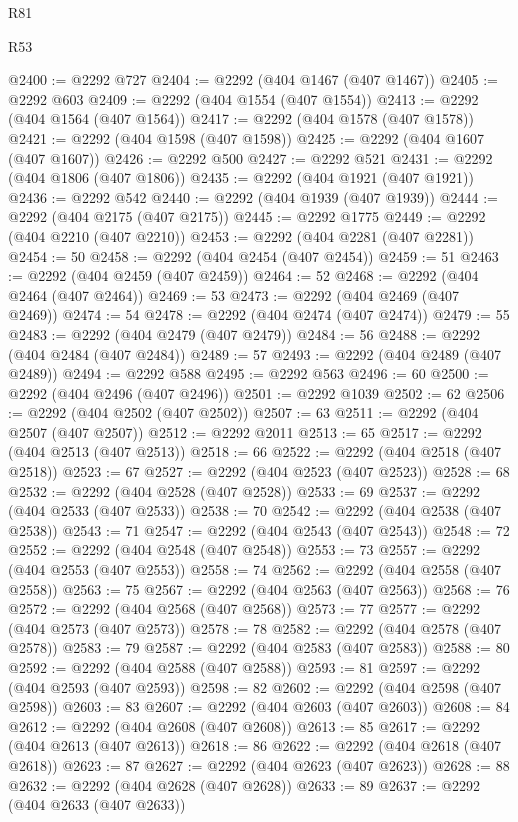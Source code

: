 \begin{lexlean}{R81}
\begin{lexlean}{R53}
\begin{coremodule}
{{{{{{{{{{{{{{{{{{{{{{{{{{{{{{{{{{{{{{{{{{{{{{{{{{{{{{{{{{{{{{{{{{{{{{{{{{{{{{{{{{{{{{{{{{{{{{{{{{{{{{{{{{{{{{{{@2400 := @2292 @727
@2404 := @2292 (@404 @1467 (@407 @1467))
@2405 := @2292 @603
@2409 := @2292 (@404 @1554 (@407 @1554))
@2413 := @2292 (@404 @1564 (@407 @1564))
@2417 := @2292 (@404 @1578 (@407 @1578))
@2421 := @2292 (@404 @1598 (@407 @1598))
@2425 := @2292 (@404 @1607 (@407 @1607))
@2426 := @2292 @500
@2427 := @2292 @521
@2431 := @2292 (@404 @1806 (@407 @1806))
@2435 := @2292 (@404 @1921 (@407 @1921))
@2436 := @2292 @542
@2440 := @2292 (@404 @1939 (@407 @1939))
@2444 := @2292 (@404 @2175 (@407 @2175))
@2445 := @2292 @1775
@2449 := @2292 (@404 @2210 (@407 @2210))
@2453 := @2292 (@404 @2281 (@407 @2281))
@2454 := 50
@2458 := @2292 (@404 @2454 (@407 @2454))
@2459 := 51
@2463 := @2292 (@404 @2459 (@407 @2459))
@2464 := 52
@2468 := @2292 (@404 @2464 (@407 @2464))
@2469 := 53
@2473 := @2292 (@404 @2469 (@407 @2469))
@2474 := 54
@2478 := @2292 (@404 @2474 (@407 @2474))
@2479 := 55
@2483 := @2292 (@404 @2479 (@407 @2479))
@2484 := 56
@2488 := @2292 (@404 @2484 (@407 @2484))
@2489 := 57
@2493 := @2292 (@404 @2489 (@407 @2489))
@2494 := @2292 @588
@2495 := @2292 @563
@2496 := 60
@2500 := @2292 (@404 @2496 (@407 @2496))
@2501 := @2292 @1039
@2502 := 62
@2506 := @2292 (@404 @2502 (@407 @2502))
@2507 := 63
@2511 := @2292 (@404 @2507 (@407 @2507))
@2512 := @2292 @2011
@2513 := 65
@2517 := @2292 (@404 @2513 (@407 @2513))
@2518 := 66
@2522 := @2292 (@404 @2518 (@407 @2518))
@2523 := 67
@2527 := @2292 (@404 @2523 (@407 @2523))
@2528 := 68
@2532 := @2292 (@404 @2528 (@407 @2528))
@2533 := 69
@2537 := @2292 (@404 @2533 (@407 @2533))
@2538 := 70
@2542 := @2292 (@404 @2538 (@407 @2538))
@2543 := 71
@2547 := @2292 (@404 @2543 (@407 @2543))
@2548 := 72
@2552 := @2292 (@404 @2548 (@407 @2548))
@2553 := 73
@2557 := @2292 (@404 @2553 (@407 @2553))
@2558 := 74
@2562 := @2292 (@404 @2558 (@407 @2558))
@2563 := 75
@2567 := @2292 (@404 @2563 (@407 @2563))
@2568 := 76
@2572 := @2292 (@404 @2568 (@407 @2568))
@2573 := 77
@2577 := @2292 (@404 @2573 (@407 @2573))
@2578 := 78
@2582 := @2292 (@404 @2578 (@407 @2578))
@2583 := 79
@2587 := @2292 (@404 @2583 (@407 @2583))
@2588 := 80
@2592 := @2292 (@404 @2588 (@407 @2588))
@2593 := 81
@2597 := @2292 (@404 @2593 (@407 @2593))
@2598 := 82
@2602 := @2292 (@404 @2598 (@407 @2598))
@2603 := 83
@2607 := @2292 (@404 @2603 (@407 @2603))
@2608 := 84
@2612 := @2292 (@404 @2608 (@407 @2608))
@2613 := 85
@2617 := @2292 (@404 @2613 (@407 @2613))
@2618 := 86
@2622 := @2292 (@404 @2618 (@407 @2618))
@2623 := 87
@2627 := @2292 (@404 @2623 (@407 @2623))
@2628 := 88
@2632 := @2292 (@404 @2628 (@407 @2628))
@2633 := 89
@2637 := @2292 (@404 @2633 (@407 @2633))
}}}}}}}}}}}}}}}}}}}}}}}}}}}}}}}}}}}}}}}}}}}}}}}}}}}}}}}}}}}}}}}}}}}}}}}}}}}}}}}}}}}}}}}}}}}}}}}}}}}}}}}}}}}}}}}}
\end{coremodule}
\end{lexlean}
\end{lexlean}
